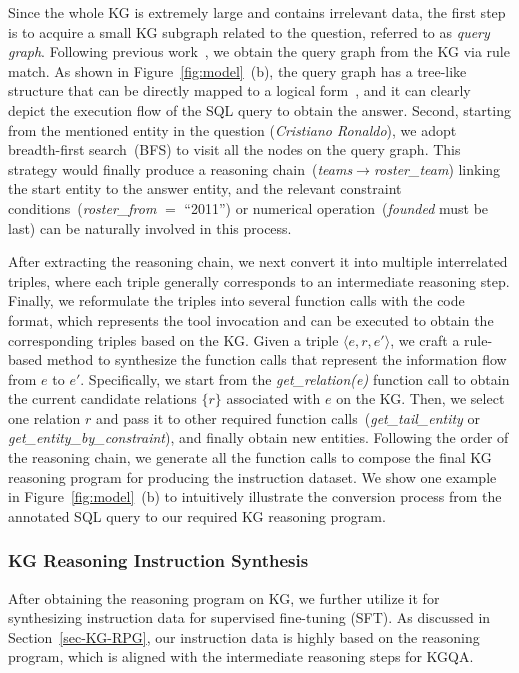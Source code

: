 Since the whole KG is extremely large and contains irrelevant data, the first step is to acquire a small KG subgraph related to the question, referred to as \emph{query graph}. Following previous work~\cite{Yin-acl-20}, we obtain the query graph from the KG via rule match.
As shown in Figure~\ref{fig:model}~(b), the query graph has a tree-like structure that can be directly mapped to a logical form~\cite{Yin-acl-20}, and it can clearly depict the execution flow of the SQL query to obtain the answer. 
Second, starting from the mentioned entity in the question (\ie \emph{Cristiano Ronaldo}), we adopt breadth-first search~(BFS) to visit all the nodes on the query graph. 
This strategy would finally produce a reasoning chain~(\eg \textit{teams$\rightarrow$roster\_team}) linking the start entity to the answer entity, and the relevant constraint conditions~(\eg \textit{roster\_from} $=$ ``2011'') or numerical operation~(\eg \textit{founded} must be last) can be naturally involved in this process. 

 After extracting the reasoning chain, we next convert it into multiple interrelated triples, where each triple generally corresponds to an intermediate reasoning step.
Finally, we reformulate the triples into several function calls with the code format, which represents the tool invocation and can be executed to obtain the corresponding triples based on the KG.
Given a triple $\langle e, r, e'\rangle$, we craft a rule-based method to synthesize the function calls that represent the information flow from $e$ to $e'$.
Specifically, we start from the \emph{get\_relation(e)} function call to obtain the current candidate relations $\{r\}$ associated with $e$ on the KG. Then, we select one relation $r$ and pass it to other required function calls~(\eg \textit{get\_tail\_entity} or \textit{get\_entity\_by\_constraint}), and finally obtain new entities.
Following the order of the reasoning chain, we generate all the function calls to compose the final KG reasoning program for producing the instruction dataset.
We show one example in Figure~\ref{fig:model}~(b) to intuitively illustrate the conversion process from the annotated SQL query to our required KG reasoning program.

\subsubsection{KG Reasoning Instruction Synthesis}\label{sec-instruction-syn}
After obtaining the reasoning program on KG, we further utilize it for synthesizing instruction data for supervised fine-tuning (SFT).  
As discussed in Section~\ref{sec-KG-RPG}, our instruction data is highly based on the reasoning program, which is aligned with the intermediate reasoning steps for KGQA.  

